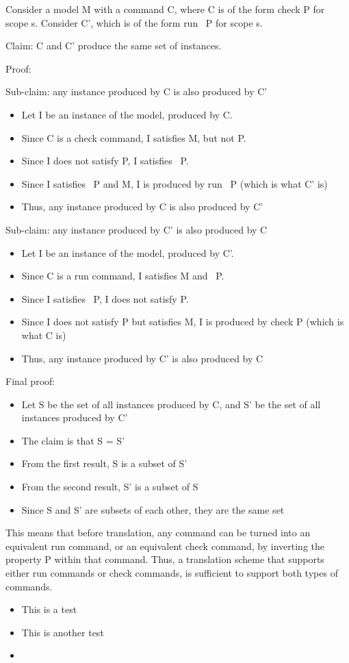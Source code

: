 Consider a model M with a command C, where C is of the form check P for scope s. Consider C', which is of the form run ~P for scope s. 

Claim: C and C' produce the same set of instances.

Proof:

Sub-claim: any instance produced by C is also produced by C'

\begin{itemize}
  \item Let I be an instance of the model, produced by C.
  \item Since C is a check command, I satisfies M, but not P.
  \item Since I does not satisfy P, I satisfies ~P.
  \item Since I satisfies ~P and M, I is produced by run ~P (which is what C' is)
  \item Thus, any instance produced by C is also produced by C'
\end{itemize}

Sub-claim: any instance produced by C' is also produced by C

\begin{itemize}
  \item Let I be an instance of the model, produced by C'.
  \item Since C is a run command, I satisfies M and ~P.
  \item Since I satisfies ~P, I does not satisfy P.
  \item Since I does not satisfy P but satisfies M, I is produced by check P (which is what C is)
  \item Thus, any instance produced by C' is also produced by C
\end{itemize}

Final proof:

\begin{itemize}
  \item Let S be the set of all instances produced by C, and S' be the set of all instances produced by C'
  \item The claim is that S = S'
  \item From the first result, S is a subset of S'
  \item From the second result, S' is a subset of S
  \item Since S and S' are subsets of each other, they are the same set
\end{itemize}

This means that before translation, any command can be turned into an equivalent run command, or an equivalent check command, by inverting the property P within that command. Thus, a translation scheme that supports either run commands or check commands, is sufficient to support both types of commands.

\begin{itemize}
  \item This is a test
  \item This is another test
  \item 
\end{itemize}